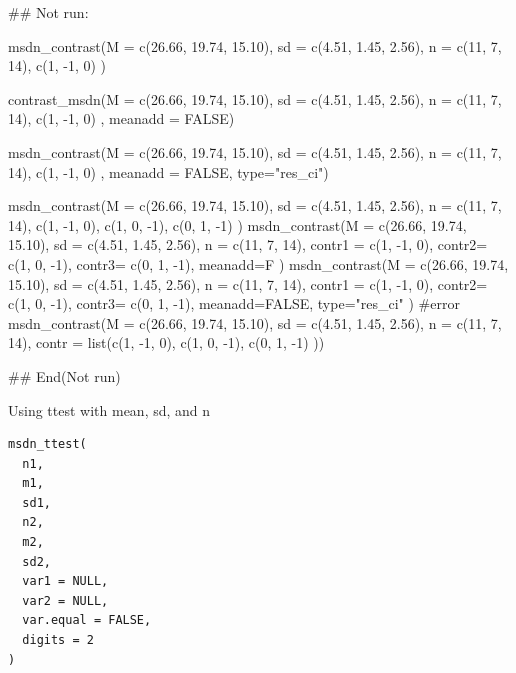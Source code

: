 \documentclass[a4paper]{book}
\begin{document}
\begin{Examples}
\begin{ExampleCode}
## Not run: 


msdn_contrast(M = c(26.66, 19.74, 15.10),
              sd = c(4.51, 1.45, 2.56),
              n = c(11, 7, 14),
              c(1, -1, 0) )

contrast_msdn(M = c(26.66, 19.74, 15.10),
              sd = c(4.51, 1.45, 2.56),
              n = c(11, 7, 14),
              c(1, -1, 0) ,
              meanadd = FALSE)

msdn_contrast(M = c(26.66, 19.74, 15.10),
              sd = c(4.51, 1.45, 2.56),
              n = c(11, 7, 14),
              c(1, -1, 0) ,
             meanadd = FALSE,
              type="res_ci")


msdn_contrast(M = c(26.66, 19.74, 15.10),
              sd = c(4.51, 1.45, 2.56),
             n = c(11, 7, 14),
              c(1, -1,  0),
              c(1,  0, -1),
              c(0,  1, -1)
)
msdn_contrast(M = c(26.66, 19.74, 15.10),
              sd = c(4.51, 1.45, 2.56),
              n = c(11, 7, 14),
              contr1 = c(1, -1,  0),
              contr2= c(1,  0, -1),
              contr3= c(0,  1, -1),
              meanadd=F
)
msdn_contrast(M = c(26.66, 19.74, 15.10),
              sd = c(4.51, 1.45, 2.56),
              n = c(11, 7, 14),
             contr1 = c(1, -1,  0),
             contr2= c(1,  0, -1),
              contr3= c(0,  1, -1),
              meanadd=FALSE, type="res_ci"
)
#error
msdn_contrast(M = c(26.66, 19.74, 15.10),
              sd = c(4.51, 1.45, 2.56),
             n = c(11, 7, 14),
              contr = list(c(1, -1,  0),
                            c(1,  0, -1),
                           c(0,  1, -1)
              ))



## End(Not run)
\end{ExampleCode}
\end{Examples}
%
\begin{Description}
Using ttest with mean, sd, and n
\end{Description}
%
\begin{Usage}
\begin{verbatim}
msdn_ttest(
  n1,
  m1,
  sd1,
  n2,
  m2,
  sd2,
  var1 = NULL,
  var2 = NULL,
  var.equal = FALSE,
  digits = 2
)
\end{verbatim}
\end{Usage}
%
\end{document}
